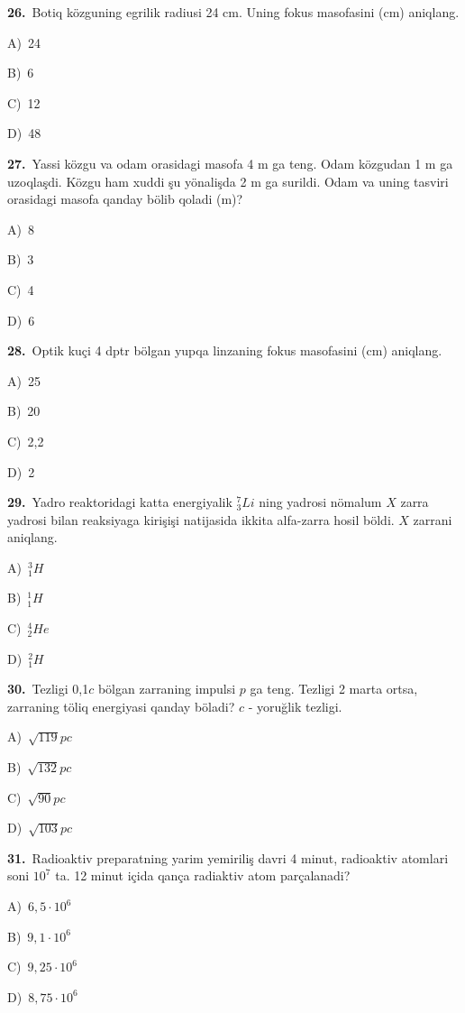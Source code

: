\documentclass[11pt,a4paper]{article}
\newcommand{\opt}[2]{\hspace*{4mm}#1)\ #2\par}
\begin{document}
\noindent\begin{minipage}{\linewidth}
\textbf{26.}\ Botiq közguning egrilik radiusi 24 cm. Uning fokus masofasini (cm) aniqlang.\par\smallskip
\opt{A}{24}
\opt{B}{6}
\opt{C}{12}
\opt{D}{48}
\end{minipage}\vspace{9pt}\par
\noindent\begin{minipage}{\linewidth}
\textbf{27.}\ Yassi közgu va odam orasidagi masofa 4 m ga teng. Odam közgudan 1 m ga uzoqlaşdi. Közgu ham xuddi şu yönalişda 2 m ga surildi. Odam va uning tasviri orasidagi masofa qanday bölib qoladi (m)?\par\smallskip
\opt{A}{8}
\opt{B}{3}
\opt{C}{4}
\opt{D}{6}
\end{minipage}\vspace{9pt}\par
\noindent\begin{minipage}{\linewidth}
\textbf{28.}\ Optik kuçi 4 dptr bölgan yupqa linzaning fokus masofasini (cm) aniqlang.\par\smallskip
\opt{A}{25}
\opt{B}{20}
\opt{C}{2,2}
\opt{D}{2}
\end{minipage}\vspace{9pt}\par
\noindent\begin{minipage}{\linewidth}
\textbf{29.}\ Yadro reaktoridagi katta energiyalik $^7_3Li$ ning yadrosi nömalum $X$ zarra yadrosi bilan reaksiyaga kirişişi natijasida ikkita alfa-zarra hosil böldi. $X$ zarrani aniqlang.\par\smallskip
\opt{A}{$^3_1H$}
\opt{B}{$^1_1H$}
\opt{C}{$^4_2He$}
\opt{D}{$^2_1H$}
\end{minipage}\vspace{9pt}\par
\noindent\begin{minipage}{\linewidth}
\textbf{30.}\ Tezligi 0,1$c$ bölgan zarraning impulsi $p$ ga teng. Tezligi 2 marta ortsa, zarraning töliq energiyasi qanday böladi? $c$ - yoruğlik tezligi.\par\smallskip
\opt{A}{$\sqrt{119}pc$}
\opt{B}{$\sqrt{132}pc$}
\opt{C}{$\sqrt{90}pc$}
\opt{D}{$\sqrt{103}pc$}
\end{minipage}\vspace{9pt}\par
\noindent\begin{minipage}{\linewidth}
\textbf{31.}\ Radioaktiv preparatning yarim yemiriliş davri 4 minut, radioaktiv atomlari soni $10^7$ ta. 12 minut içida qança radiaktiv atom parçalanadi?\par\smallskip
\opt{A}{$6{,}5\cdot10^6$}
\opt{B}{$9{,}1\cdot10^6$}
\opt{C}{$9{,}25\cdot10^6$}
\opt{D}{$8{,}75\cdot10^6$}
\end{minipage}\vspace{9pt}\par
\end{document}
